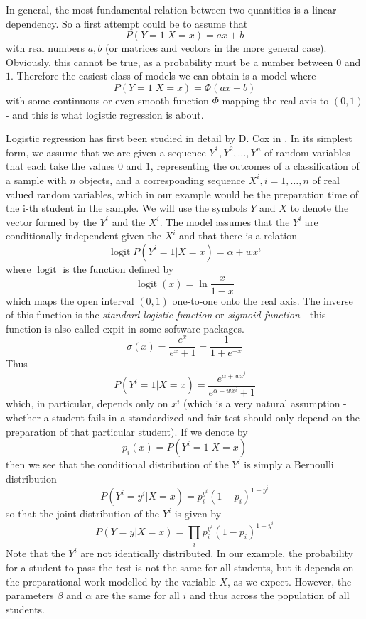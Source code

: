 \documentclass[a4paper, draft]{report}
\numberwithin{section}{chapter}
\numberwithin{equation}{chapter}
\theoremstyle{own}
\theoremstyle{remark}
\DeclareMathOperator{\logit}{logit}
\begin{document}
In general, the most fundamental relation between two quantities is a linear dependency. So a first attempt could be to assume that
$$
P(Y = 1 | X = x) = ax + b
$$
with real numbers $a,b$ (or matrices and vectors in the more general case). Obviously, this cannot be true, as a probability must be a number between $0$ and $1$. Therefore the easiest class of models we can obtain is a model where
$$
P(Y = 1 | X = x) = \Phi(ax + b)
$$
with some continuous or even smooth function $\Phi$ mapping the real axis to $(0,1)$ - and this is what logistic regression is about. 

Logistic regression has first been studied in detail by D. Cox in \cite{Cox}. In its simplest form, we assume that we are given a sequence $Y^{1}, Y^2, \dots, Y^n$ of random variables that each take the values $0$ and $1$, representing the outcomes of a classification of
a sample with $n$ objects, and a corresponding sequence $X^i, i = 1, \dots, n$ of real valued random variables, which in our example would be the preparation time of the i-th student in the sample. We will use the symbols $Y$ and $X$ to denote the vector formed by the $Y^i$ and the $X^i$. The model assumes that the $Y^i$ are conditionally independent given the $X^i$ and that there is a relation
$$
\logit P(Y^i = 1 | X = x) = \alpha + w x^i
$$
where $\logit$  is the function defined by
$$
\logit(x) = \ln \frac{x}{1-x}
$$
which maps the open interval $(0,1)$ one-to-one onto the real axis. The inverse of this function is the {\em standard logistic function} or {\em sigmoid function} - this function is also called expit in some software packages.
$$
\sigma(x) = \frac{e^x}{e^x + 1} = \frac{1}{1+e^{-x}}
$$
Thus
$$
 P(Y^i = 1 | X = x) = \frac{e^{\alpha + w x^i}}{e^{\alpha + w x^i} + 1}
$$
which, in particular, depends only on $x^i$ (which is a very natural assumption - whether a student fails in a standardized and fair test should only depend on the preparation of that particular student).
If we denote by 
$$
p_i (x) = P(Y^i = 1 | X = x)
$$
then we see that the conditional distribution of the $Y^i$ is simply a Bernoulli distribution
$$
P(Y^i = y^i | X= x) = p_i^{y^i}(1-p_i)^{1-y^i}
$$
so that the joint distribution of the $Y^i$ is given by
$$
P(Y = y | X = x) = \prod_i p_i^{y^i}(1-p_i)^{1-y^i}
$$
Note that the $Y^i$ are not identically distributed. In our example, the probability for a student to pass the test is not the same for all students, but it depends on the preparational work modelled by the variable $X$, as we expect. However, the parameters $\beta$ and $\alpha$ are the same
for all $i$ and thus across the population of all students.
\end{document}
